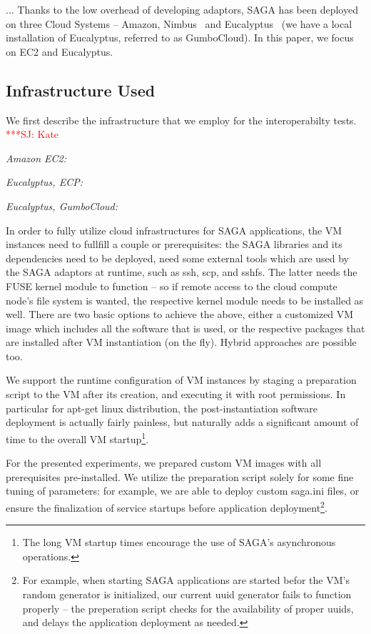 \documentclass[conference,final]{IEEEtran}
\newcommand{\jhanote}[1]{ {\textcolor{red} { ***SJ: #1 }}}
\newcommand{\jhanote}[1]{}
\begin{document}
... Thanks to the low overhead of developing adaptors, SAGA has been
deployed on three Cloud Systems -- Amazon, Nimbus~\cite{nimbus} and
Eucalyptus~\cite{eucalyptus} (we have a local installation of
Eucalyptus, referred to as GumboCloud).  In this paper, we focus on
EC2 and Eucalyptus.


\subsection*{Infrastructure Used} We first describe the infrastructure
that we employ for the interoperabilty tests.  \jhanote{Kate}

{\it Amazon EC2:} 

{\it Eucalyptus, ECP:} 

{\it Eucalyptus, GumboCloud:}


In order to fully utilize cloud infrastructures for SAGA applications,
the VM instances need to fullfill a couple or prerequisites: the SAGA
libraries and its dependencies need to be deployed, need some external
tools which are used by the SAGA adaptors at runtime, such as ssh,
scp, and sshfs.  The latter needs the FUSE kernel module to function
-- so if remote access to the cloud compute node's file system is
wanted, the respective kernel module needs to be installed as well.
There are two basic options to achieve the above, either a customized
VM image which includes all the software that is used, or the
respective packages that are installed after VM instantiation (on the
fly).  Hybrid approaches are possible too.

We support the runtime configuration of VM instances by staging a
preparation script to the VM after its creation, and executing it with
root permissions.  In particular for apt-get linux distribution, the
post-instantiation software deployment is actually fairly painless,
but naturally adds a significant amount of time to the overall VM
startup\footnote{The long VM startup times encourage the use of SAGA's
  asynchronous operations.}.

For the presented experiments, we prepared custom VM images with all
prerequisites pre-installed.  We utilize the preparation script solely
for some fine tuning of parameters: for example, we are able to deploy
custom saga.ini files, or ensure the finalization of service startups
before application deployment\footnote{For example, when starting SAGA
  applications are started befor the VM's random generator is
  initialized, our current uuid generator fails to function properly
  -- the preperation script checks for the availability of proper
  uuids, and delays the application deployment as needed.}.
\end{document}
